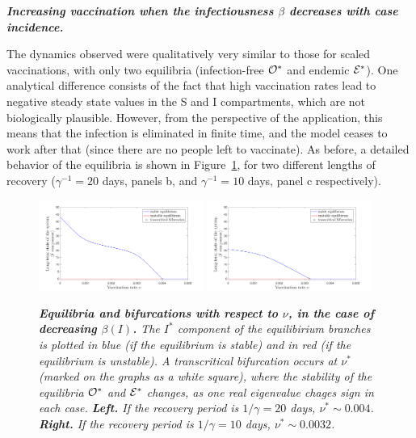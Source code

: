 \documentclass[10pt]{article}
\begin{document}
\noindent \textbf{\emph{ Increasing vaccination when the infectiousness $\beta$ decreases with case incidence.}} 

\noindent The dynamics observed were qualitatively very similar to those for scaled vaccinations, with only two equilibria (infection-free ${\cal O}^*$ and endemic ${\cal E}^*$). One analytical difference consists of the fact that high vaccination rates lead to negative steady state values in the S and I compartments, which are not biologically plausible. However, from the perspective of the application, this means that the infection is eliminated in finite time, and the model ceases to work after that (since there are no people left to vaccinate). As before, a detailed behavior of the equilibria is shown in Figure~\ref{decreasing_beta}, for two different lengths of recovery ($\gamma^{-1}=20$ days, panels b, and $\gamma^{-1}=10$ days, panel c respectively). 

\begin{figure}[h!]
\begin{center}
\includegraphics[width=0.48\textwidth]{figures/N_decreasing_beta_20.png}
\includegraphics[width=0.48\textwidth]{figures/N_decreasing_beta_10.png}
\caption{\emph{{\bf Equilibria and bifurcations with respect to $\nu$, in the case of decreasing $\beta(I)$.} The $I^*$ component of the equilibirium branches is plotted in blue (if the equilibrium is stable) and in red (if the equilibrium is unstable). A transcritical bifurcation occurs at $\nu^*$ (marked on the graphs as a white square), where the stability of the equilibria ${\cal O}^*$ and ${\cal E}^*$ changes, as one real eigenvalue chages sign in each case. {\bf Left.} If the recovery period is $1/\gamma = 20$ days, $\nu^* \sim 0.004$. {\bf Right.} If the recovery period is $1/\gamma = 10$ days, $\nu^* \sim 0.0032$.}}
\label{decreasing_beta}
\end{center}
\end{figure}
\end{document}
